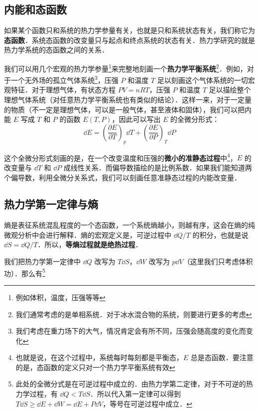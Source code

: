 
\subsection{内能和态函数}
如果某个函数只和系统的热力学参量有关，也就是只和系统状态有关，我们称它为\textbf{态函数}．系统态函数的改变量只与起点和终点系统的状态有关．热力学研究的就是热力学系统的态函数之间的关系．

我们可以用几个宏观的热力学参量\footnote{例如体积，温度，压强等等}来完整地刻画一个\textbf{热力学平衡系统}\footnote{我们通常考虑的是单相系统．对于冰水混合物的系统，则要进行更多的考虑}．例如，对于一个无外场的孤立气体系统\footnote{我们考虑在重力场下的大气，情况肯定会有所不同，压强会随高度的变化而变化}，压强 $P$ 和温度 $T$ 足以刻画这个气体系统的一切宏观特征．对于理想气体，有状态方程 $PV=nRT$，压强 $P$ 和温度 $T$ 足以描绘整个理想气体系统（对任意热力学平衡系统也有类似的结论）．这样一来，对于一定量的物质（不一定是理想气体，可以是一般气体，甚至液体和固体），我们可以把内能 $E$ 写成 $T$ 和 $P$ 的函数 $E(T,P)$，因此可以写出 $E$ 的全微分形式：
\begin{equation}
\dd E=\left(\frac{\partial E}{\partial T}\right)_p \dd T + \left(\frac{\partial E}{\partial P}\right)_T \dd P
\end{equation}

这个全微分形式刻画的是，在一个改变温度和压强的\textbf{微小的准静态过程}中\footnote{也就是说，在这个过程中，系统每时每刻都是平衡态，$E$ 总是态函数．要注意的是，态函数的定义只对一个热力学平衡系统有效}，$E$ 的改变量与 $\dd T$ 和 $\dd P$ 成线性关系．而偏导数描绘的是比例系数．如果我们能知道两个偏导数，利用全微分关系式，我们可以刻画任意准静态过程的内能改变量．

\subsection{热力学第一定律与熵}
熵是表征系统混乱程度的一个态函数，一个系统熵越小，则越有序，这会在熵的纯微观分析中会进行解释．熵的宏观定义是，可逆过程中 $\dd Q/T$ 的积分，也就是说 $\dd S=\dd Q/T$．所以，\textbf{等熵过程就是绝热过程}．

我们把热力学第一定律中 $\dd Q$ 改写为 $T\dd S$，$\dd W$ 改写为 $p\dd V$（这里我们只考虑体积功）．那么有\footnote{
此处的全微分式是在可逆过程中成立的．由热力学第二定律，对于不可逆的热力学过程，有 $\dd Q<T\dd S$．所以代入第一定律可以得到 $T\dd S\ge \dd E+\dd W=\dd E+P\dd V$，等号在可逆过程中成立．
}

